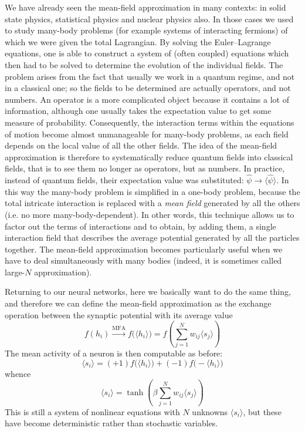 We have already seen the mean-field approximation in many contexts: in solid state physics, statistical physics and nuclear physics also. In those cases we used to study many-body problems (for example systems of interacting fermions) of which we were given the total Lagrangian. By solving the Euler--Lagrange equations, one is able to construct a system of (often coupled) equations which then had to be solved to determine the evolution of the individual fields. The problem arises from the fact that usually we work in a quantum regime, and not in a classical one; so the fields to be determined are actually operators, and not numbers. An operator is a more complicated object because it contains a lot of information, although one usually takes the expectation value to get some measure of probability. Consequently, the interaction terms within the equations of motion become almost unmanageable for many-body problems, as each field depends on the local value of all the other fields. The idea of the mean-field approximation is therefore to systematically reduce quantum fields into classical fields, that is to see them no longer as operators, but as numbers. In practice, instead of quantum fields, their expectation value was substituted: $\widehat{\psi}\rightarrow\langle\widehat{\psi}\rangle$. In this way the many-body problem is simplified in a one-body problem, because the total intricate interaction is replaced with a \emph{mean field} generated by all the others (i.e. no more many-body-dependent). In other words, this technique allows us to factor out the terms of interactions and to obtain, by adding them, a single interaction field that describes the average potential generated by all the particles together. The mean-field approximation becomes particularly useful when we have to deal simultaneously with many bodies (indeed, it is sometimes called large-$N$ approximation).

Returning to our neural networks, here we basically want to do the same thing, and therefore we can define the mean-field approximation as the exchange operation between the synaptic potential with its average value
\begin{equation}
f(h_i)\xrightarrow{\text{MFA}}f\bigl(\langle h_i\rangle\bigr)=f\!\left(\sum_{j=1}^Nw_{ij}\langle s_j\rangle\right)
\end{equation}
The mean activity of a neuron is then computable as before:
\begin{equation}
\langle s_i\rangle=(+1)f\bigl(\langle h_i\rangle\bigr)+(-1)f\bigl(-\langle h_i\rangle\bigr)
\end{equation}
whence
\begin{equation}\label{StochasticNetwork}
\boxed{\langle s_i\rangle=\tanh{\left(\beta\sum_{j=1}^Nw_{ij}\langle s_j\rangle\right)}}
\end{equation}
This is still a system of nonlinear equations with $N$ unknowns $\langle s_i\rangle$, but these have become deterministic rather than stochastic variables.

